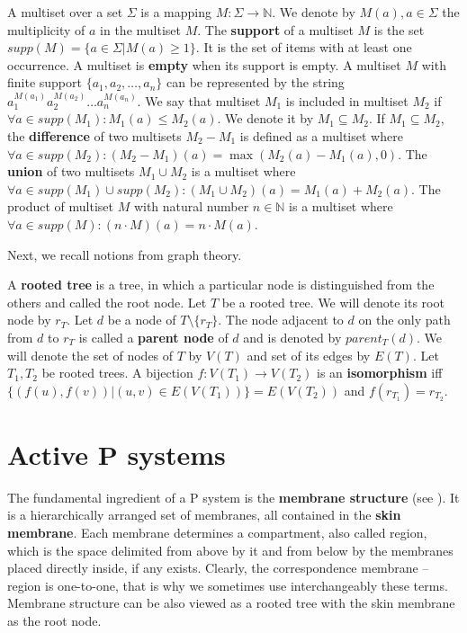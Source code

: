\documentclass[llncs,submission,copyright,creativecommons]{../lib/lncs/llncs}
\begin{document}
A multiset over a set $\Sigma$ is a mapping $M: \Sigma\rightarrow \mathbb N$.
We denote by $M(a), a\in \Sigma$ the multiplicity of $a$ in the multiset $M$.
The {\bf support} of a multiset $M$ is the set $supp(M)=\{a\in \Sigma|M(a)\geq 1\}$.
It is the set of items with at least one occurrence.
A multiset is {\bf empty} when its support is empty.
A multiset $M$ with finite support $\{a_1, a_2, \dots, a_n\}$ can be represented by the string $a_1^{M(a_1)}a_2^{M(a_2)}\dots a_n^{M(a_n)}$.
We say that multiset $M_1$ is included in multiset $M_2$ if $\forall a \in supp(M_1): M_1(a)\leq M_2(a)$.
We denote it by $M_1\subseteq M_2$.
If $M_1\subseteq M_2$, the {\bf difference} of two multisets $M_2-M_1$ is defined as a multiset where $\forall a \in supp(M_2): (M_2-M_1)(a)=\max(M_2(a)-M_1(a),0)$.
The {\bf union} of two multisets $M_1\cup M_2$ is a multiset where $\forall a \in supp(M_1)\cup supp(M_2): (M_1\cup M_2)(a)=M_1(a)+M_2(a)$.
The product of multiset $M$ with natural number $n\in \mathbb N$ is a multiset where $\forall a \in supp(M): (n\cdot M)(a)=n\cdot M(a)$.

Next, we recall notions from graph theory.

A {\bf rooted tree} is a tree, in which a particular node is distinguished from the others and called the root node.
Let $T$ be a rooted tree. We will denote its root node by $r_T$.
Let $d$ be a node of $T\setminus\{r_T\}$. The node adjacent to $d$ on the only path from $d$ to $r_T$ is called a {\bf parent node} of $d$ and is denoted by $parent_T(d)$.
We will denote the set of nodes of $T$ by $V(T)$ and set of its edges by $E(T)$.
Let $T_1, T_2$ be rooted trees. A bijection $f: V(T_1)\rightarrow V(T_2)$ is an {\bf isomorphism} iff $\{(f(u),f(v))|(u,v)\in E(V(T_1))\} = E(V(T_2))$ and $f(r_{T_1}) = r_{T_2}$. 

  
\section{Active P systems}
\label{sec:p systems}


The fundamental ingredient of a P system is the {\bf membrane structure} (see \cite{Paun2006Introduction}). It is a hierarchically arranged set of membranes, all contained in the {\bf skin membrane}. Each membrane determines a compartment, also called region, which is the space delimited from above by it and from below by the membranes placed directly inside, if any exists. Clearly, the correspondence membrane – region is one-to-one, that is why we sometimes use interchangeably these terms.
Membrane structure can be also viewed as a rooted tree with the skin membrane as the root node.
\end{document}
